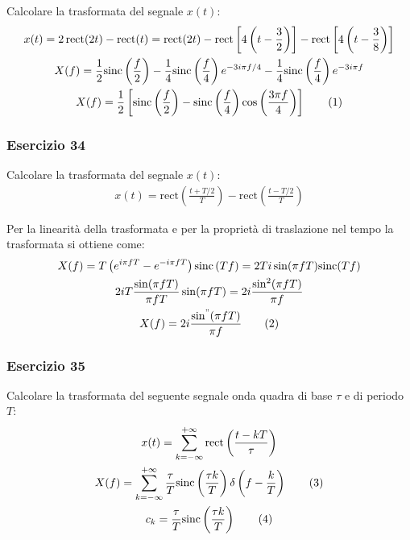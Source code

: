 \documentclass{article}
\newcommand{\rect}{\mathrm{rect}}
\newcommand{\sinc}{\mathrm{sinc}}
\newcommand{\tageq}{\tag{\stepcounter{equation}\theequation}}
\begin{document}
Calcolare la trasformata del segnale $x(t)$:
\begin{gather*}
    x(t)=2\,\rect(2t)-\rect(t)=\rect(2t)-\rect\left[\displaystyle4\left(t-\frac{3}{2}\right)\right]-\rect\left[\displaystyle4\left(t-\frac{3}{8}\right)\right]\\
    X(f)=\displaystyle\frac{1}{2}\sinc\left(\frac{f}{2}\right)-\frac{1}{4}\sinc\left(\frac{f}{4}\right)e^{-3i\pi f/4}-\frac{1}{4}\sinc\left(\frac{f}{4}\right)e^{-3i\pi f}\\
    X(f)=\displaystyle\frac{1}{2}\left[\sinc\left(\frac{f}{2}\right)-\sinc\left(\frac{f}{4}\right)\cos\left(\frac{3\pi f}{4}\right)\right]\tageq
\end{gather*}

\subsubsection*{Esercizio 34}

Calcolare la trasformata del segnale $x(t)$:
\begin{gather*}
    x(t)=\rect\left(\displaystyle\frac{t+T/2}{T}\right)-\rect\left(\displaystyle\frac{t-T/2}{T}\right)
\end{gather*}

\begin{center}
\end{center}
Per la linearità della trasformata e per la proprietà di traslazione nel tempo la trasformata si ottiene come:
\begin{gather*}
    X(f)=T\left(e^{i\pi fT}-e^{-i\pi fT}\right)\sinc\left(T f\right)=2Ti\sin(\pi fT)\sinc(Tf)\\
    2iT\displaystyle\frac{\sin(\pi fT)}{\pi fT}\sin(\pi fT)=2i\frac{\sin^2(\pi fT)}{\pi f}\\
    X(f)=2i\displaystyle\frac{\sin^"(\pi fT)}{\pi f}\tageq
\end{gather*}

\subsubsection*{Esercizio 35}

Calcolare la trasformata del seguente segnale onda quadra di base $\tau$ e di periodo $T$:
\begin{gather*}
    x(t)=\displaystyle\sum_{k=-\infty}^{+\infty}\rect\left(\frac{t-kT}{\tau}\right)\\
    X(f)=\displaystyle\sum_{k=-\infty}^{+\infty}\frac{\tau}{T}\sinc\left(\frac{\tau k}{T}\right)\delta\left(f-\frac{k}{T}\right)\tageq\\
    c_k=\displaystyle\frac{\tau}{T}\sinc\left(\frac{\tau k}{T}\right)\tageq
\end{gather*}
\end{document}

